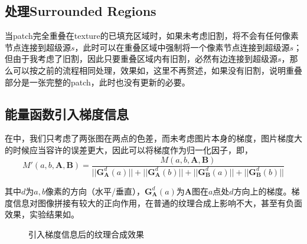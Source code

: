 \documentclass[11pt,a4paper]{article}
\begin{document}
\subsection{处理Surrounded Regions}

当patch完全重叠在texture的已填充区域时，如果未考虑旧割，将不会有任何像素节点连接到超级源$s$，此时可以在重叠区域中强制将一个像素节点连接到超级源$s$；但由于我考虑了旧割，因此只要重叠区域内有旧割，必然有边连接到超级源$s$，那么可以按之前的流程相同处理，效果如，这里不再赘述，如果没有旧割，说明重叠部分是一张完整的patch，此时也没有更新的必要。

\subsection{能量函数引入梯度信息}

在中，我们只考虑了两张图在两点的色差，而未考虑图片本身的梯度，图片梯度大的时候应当容许的误差更大，因此可以将梯度作为归一化因子，即，
\begin{equation}
    M'(a,b,\mathbf{A},\mathbf{B}) = \frac{M(a,b,\mathbf{A},\mathbf{B})}{||\mathbf{G}_\mathbf{A}^d(a)||+||\mathbf{G}_\mathbf{A}^d(b)||+||\mathbf{G}_\mathbf{B}^d(a)||+||\mathbf{G}_\mathbf{B}^d(b)||}
\end{equation}

其中$d$为$a,b$像素的方向（水平/垂直），$\mathbf{G}_\mathbf{A}^d(a)$为$\mathbf{A}$图在$a$点处$d$方向上的梯度。梯度信息对图像拼接有较大的正向作用，在普通的纹理合成上影响不大，甚至有负面效果，实验结果如。

\begin{figure}[H]
    \centering
    \caption{引入梯度信息后的纹理合成效果}
    \label{fig:grad}
\end{figure}
\end{document}

